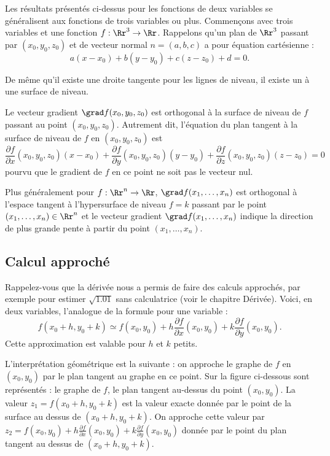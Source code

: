 \documentclass[11pt,class=report,crop=false]{standalone}
\begin{document}
Les résultats présentés ci-dessus pour les fonctions de deux variables se généralisent aux fonctions de trois variables ou plus.
Commençons avec trois variables et une fonction $f:\Rr^3 \to \Rr$.
Rappelons qu'un plan de $\Rr^3$ passant par $(x_0,y_0,z_0)$ et de vecteur normal 
$n=(a,b,c)$ a pour équation cartésienne :
$$a(x-x_0)+b(y-y_0)+c(z-z_0) + d =0.$$


De même qu'il existe une droite tangente pour les lignes de niveau, il existe un  à une surface de niveau.


\begin{proposition}
Le vecteur gradient $\grad f(x_0,y_0,z_0)$ est orthogonal à la surface de niveau de $f$ passant au point $(x_0,y_0,z_0)$. Autrement dit,
l'équation du plan tangent à la surface de niveau de $f$ en $(x_0,y_0,z_0)$ est 
$$\frac{\partial f}{\partial x}(x_0,y_0,z_0)(x-x_0)
+\frac{\partial f}{\partial y}(x_0,y_0,z_0)(y-y_0)
+\frac{\partial f}{\partial z}(x_0,y_0,z_0)(z-z_0)
 = 0 $$
pourvu que le gradient de $f$ en ce point ne soit pas le vecteur nul.
\end{proposition}




Plus généralement pour $f : \Rr^n \to \Rr$, $\grad f (x_1,\ldots,x_n)$ est orthogonal à l'espace tangent à
l'hypersurface de niveau $f=k$ passant par le point $(x_1,\ldots,x_n)\in\Rr^n$ et 
le vecteur gradient $\grad f(x_1,\ldots,x_n)$ indique la direction de plus grande pente à partir du point $(x_1,\ldots,x_n)$.



\subsection{Calcul approché}

Rappelez-vous que la dérivée nous a permis de faire des calculs approchés, par exemple pour estimer $\sqrt{1.01}$ sans calculatrice (voir le chapitre \og{}Dérivée\fg{}).
Voici, en deux variables, l'analogue de la formule pour une variable : 
$$f(x_0+h,y_0+k) \simeq f(x_0,y_0) + h\frac{\partial f}{\partial x}(x_0,y_0)
+k\frac{\partial f}{\partial y}(x_0,y_0).$$
Cette approximation est valable pour $h$ et $k$ petits.

L'interprétation géométrique est la suivante : 
on approche le graphe de $f$ en $(x_0,y_0)$ par le plan tangent au graphe en ce point. Sur la figure ci-dessous sont représentés : le graphe de $f$, le plan tangent au-dessus du point $(x_0,y_0)$. La valeur $z_1 = f(x_0+h,y_0+k)$ est la valeur exacte donnée par le point de la surface au dessus de $(x_0+h,y_0+k)$. On approche cette valeur par $z_2 = f(x_0,y_0) + h\frac{\partial f}{\partial x}(x_0,y_0)
+k\frac{\partial f}{\partial y}(x_0,y_0)$ donnée par le point du plan tangent au dessus de $(x_0+h,y_0+k)$. 
\end{document}
